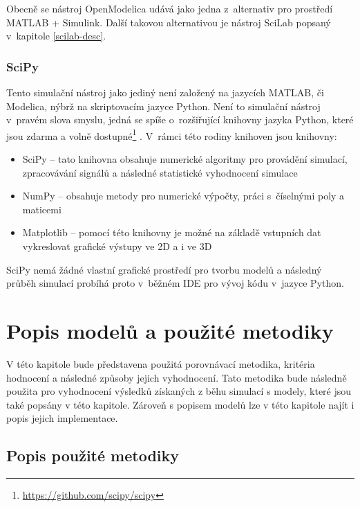 Obecně se nástroj OpenModelica udává jako jedna z~alternativ pro prostředí MATLAB + Simulink. Další takovou alternativou je nástroj SciLab popsaný v~kapitole \ref{scilab-desc}.

\subsection{SciPy}
\label{chapter-scipy}
Tento simulační nástroj jako jediný není založený na jazycích MATLAB, či Modelica, nýbrž na skriptovacím jazyce Python. Není to simulační nástroj v~pravém slova smyslu, jedná se spíše o~rozšiřující knihovny jazyka Python, které jsou zdarma a volně dostupné\footnote{\url{https://github.com/scipy/scipy}} \cite{scipy}. V~rámci této rodiny knihoven jsou knihovny:
\begin{itemize}
    \item SciPy -- tato knihovna obsahuje numerické algoritmy pro provádění simulací, zpracovávání signálů a následné statistické vyhodnocení simulace
    \item NumPy -- obsahuje metody pro numerické výpočty, práci s~číselnými poly a maticemi
    \item Matplotlib -- pomocí této knihovny je možné na základě vstupních dat vykreslovat grafické výstupy ve 2D a i ve 3D
\end{itemize}

SciPy nemá žádné vlastní grafické prostředí pro tvorbu modelů a následný průběh simulací probíhá proto v~běžném IDE pro vývoj kódu v~jazyce Python.

\chapter{Popis modelů a použité metodiky}
\label{kapitola4}
V této kapitole bude představena použitá porovnávací metodika, kritéria hodnocení a následné způsoby jejich vyhodnocení. Tato metodika bude následně použita pro vyhodnocení výsledků získaných z běhu simulací s modely, které jsou také popsány v této kapitole. Zároveň s popisem modelů lze v této kapitole najít i popis jejich implementace.

\section{Popis použité metodiky}

